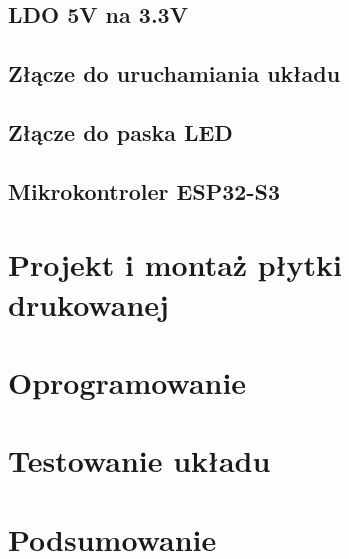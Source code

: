 \documentclass[twoside]{article}
\begin{document}
\subsection{LDO 5V na 3.3V}

\newpage

\subsection{Złącze do uruchamiania układu}

\newpage

\subsection{Złącze do paska LED}

\newpage

\subsection{Mikrokontroler ESP32-S3}

\newpage

\section{Projekt i montaż płytki drukowanej}


\newpage

\section{Oprogramowanie}

\newpage

\section{Testowanie układu}
\label{sec:testy}

\newpage

\section{Podsumowanie}

\newpage

\printbibliography[]
\newpage
\listoffigures
{}
\newpage
\listoftables
{}
\end{document}
